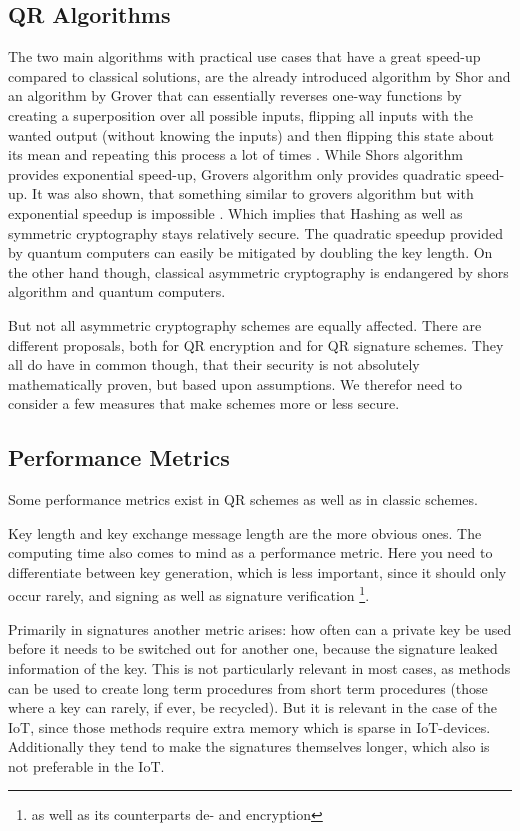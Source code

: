 \documentclass[conference]{IEEEtran}
\newcommand{\comment}[1]{}
\begin{document}
\subsection{QR Algorithms}\label{l:qr-algs}
The two main algorithms with practical use cases that have a great speed-up compared to classical solutions, are the already introduced algorithm by Shor and an algorithm by Grover that can essentially reverses one-way functions by creating a superposition over all possible inputs, flipping all inputs with the wanted output (without knowing the inputs) and then flipping this state about its mean and repeating this process a lot of times \cite{Grover}.
While Shors algorithm provides exponential speed-up, Grovers algorithm only provides quadratic speed-up. It was also shown, that something similar to grovers algorithm but with exponential speedup is impossible \cite{Strengths&Weaknesses_QC}. 
Which implies that Hashing as well as symmetric cryptography stays relatively secure.
The quadratic speedup provided by quantum computers can easily be mitigated by doubling the key length.
On the other hand though, classical asymmetric cryptography is endangered by shors algorithm and quantum computers.

But not all asymmetric cryptography schemes are equally affected.
There are different proposals, both for QR encryption and for QR signature schemes.
They all do have in common though, that their security is not absolutely mathematically proven, but based upon assumptions.
We therefor need to consider a few measures that make schemes more or less secure.

\subsection{Performance Metrics}
\comment{ %
\cite{springer_security_analyses}:
Qubit cost, Quantum Gate cost
} %

Some performance metrics exist in QR schemes as well as in classic schemes.

Key length and key exchange message length \cite{QR_algs} are the more obvious ones.
The computing time also comes to mind as a performance metric. Here you need to differentiate between key generation, which is less important, since it should only occur rarely, and signing as well as signature verification \footnote{as well as its counterparts de- and encryption}.

Primarily in signatures another metric arises: how often can a private key be used before it needs to be switched out for another one, because the signature leaked information of the key.
This is not particularly relevant in most cases, as methods can be used to create long term procedures from short term procedures (those where a key can rarely, if ever, be recycled).
But it is relevant in the case of the IoT, since those methods require extra memory which is sparse in IoT-devices. Additionally they tend to make the signatures themselves longer, which also is not preferable in the IoT. \cite{QR_algs}
\end{document}
